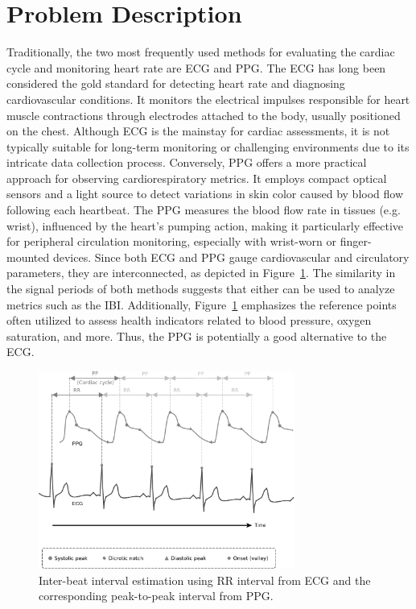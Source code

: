 \section{Problem Description}
\label{sec:problem}

Traditionally, the two most frequently used methods for evaluating the cardiac cycle and monitoring heart rate are \acrlong{ECG} and \acrlong{PPG}. The \gls{ECG} has long been considered the gold standard for detecting heart rate and diagnosing cardiovascular conditions. It monitors the electrical impulses responsible for heart muscle contractions through electrodes attached to the body, usually positioned on the chest. Although \gls{ECG} is the mainstay for cardiac assessments, it is not typically suitable for long-term monitoring or challenging environments due to its intricate data collection process. Conversely, \gls{PPG} offers a more practical approach for observing cardiorespiratory metrics. It employs compact optical sensors and a light source to detect variations in skin color caused by blood flow following each heartbeat. The \gls{PPG} measures the blood flow rate in tissues (e.g. wrist), influenced by the heart's pumping action, making it particularly effective for peripheral circulation monitoring, especially with wrist-worn or finger-mounted devices. Since both \gls{ECG} and \gls{PPG} gauge cardiovascular and circulatory parameters, they are interconnected, as depicted in Figure~\ref{fig:ecg_and_ppg}. The similarity in the signal periods of both methods suggests that either can be used to analyze metrics such as the \gls{IBI}. Additionally, Figure~\ref{fig:ecg_and_ppg} emphasizes the reference points often utilized to assess health indicators related to blood pressure, oxygen saturation, and more. Thus, the \gls{PPG} is potentially a good alternative to the \gls{ECG}.

\begin{figure}[]
    \centering
    \includegraphics[width=0.75\textwidth]{img/ecg_ppg_signals.pdf}
    \caption{Inter-beat interval estimation using RR interval from \acrlong{ECG} and the corresponding peak-to-peak interval from \acrlong{PPG}.}
    \label{fig:ecg_and_ppg}
\end{figure}


